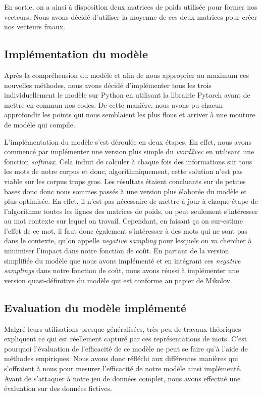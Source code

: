 \documentclass[11pt,french,french]{article}
\begin{document}
En sortie, on a ainsi à disposition deux matrices de poids utilisée pour
former nos vecteurs. Nous avons décidé d'utiliser la moyenne de ces deux
matrices pour créer nos vecteurs finaux.

\subsection{Implémentation du
modèle}\label{impluxe9mentation-du-moduxe8le}

Après la compréhension du modèle et afin de nous approprier au maximum
ces nouvelles méthodes, nous avons décidé d'implémenter tous les trois
individuellement le modèle sur Python en utilisant la librairie Pytorch
avant de mettre en commun nos codes. De cette manière, nous avons pu
chacun approfondir les points qui nous semblaient les plus flous et
arriver à une mouture de modèle qui compile.

L'implémentation du modèle s'est déroulée en deux étapes. En effet, nous
avons commencé par implémenter une version plus simple du
\emph{word2vec} en utilisant une fonction \emph{softmax}. Cela induit de
calculer à chaque fois des informations sur tous les mots de notre
corpus et donc, algorithmiquement, cette solution n'est pas viable sur
les corpus trops gros. Les résultats étaient concluants sur de petites
bases donc donc nous sommes passés à une version plus élaborée du modèle
et plus optimisée. En effet, il n'est pas nécessaire de mettre à jour à
chaque étape de l'algorithme toutes les lignes des matrices de poids, on
peut seulement s'intéresser au mot contexte sur lequel on travail.
Cependant, en faisant ça on sur-estime l'effet de ce mot, il faut donc
également s'intéresser à des mots qui ne sont pas dans le contexte,
qu'on appelle \emph{negative sampling} pour lesquels on va chercher à
minimiser l'impact dans notre fonction de coût. En partant de la version
simplifiée du modèle que nous avons implémenté et en intégrant ces
\emph{negative samplings} dans notre fonction de coût, nous avons réussi
à implémenter une version quasi-définitive du modèle qui est conforme au
papier de Mikolov.

\subsection{Evaluation du modèle
implémenté}\label{evaluation-du-moduxe8le-impluxe9mentuxe9}

Malgré leurs utilisations presque généralisées, très peu de travaux
théoriques expliquent ce qui est réellement capturé par ces
représentations de mots. C'est pourquoi l'évaluation de l'efficacité de
ce modèle ne peut se faire qu'à l'aide de méthodes empiriques. Nous
avons donc réfléchi aux différentes manières qui s'offraient à nous pour
mesurer l'efficacité de notre modèle ainsi implémenté. Avant de
s'attaquer à notre jeu de données complet, nous avons effectué une
évaluation sur des données fictives.
\end{document}
